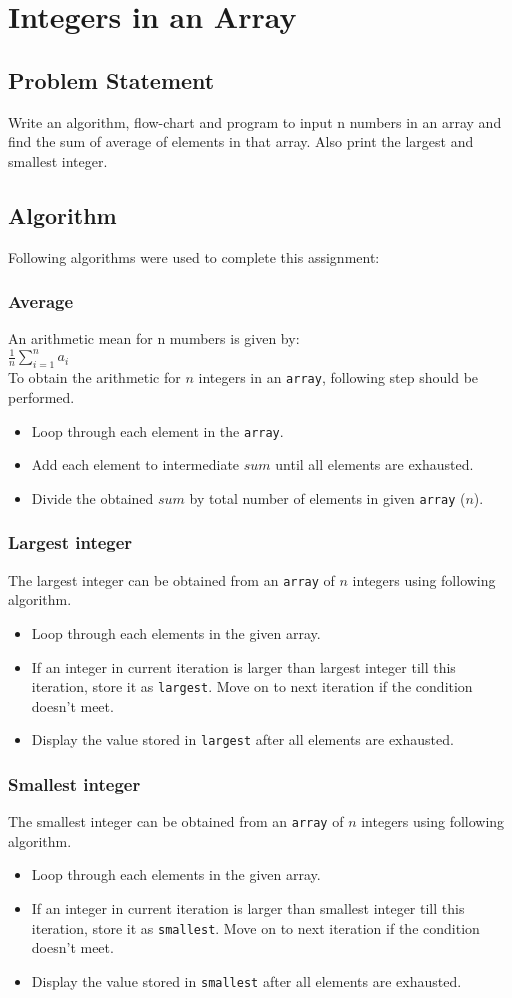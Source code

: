 \documentclass[11pt]{report}
\begin{document}
\chapter{Integers in an Array}
\section{Problem Statement}
Write an algorithm, flow-chart and program to input n numbers in an array and find the sum of average of elements in that array. Also print the largest and smallest integer.
\section{Algorithm}
Following algorithms were used to complete this assignment:
\subsection{Average}
An arithmetic mean for n mumbers is given by:\\
$
\frac{1}{n}\sum_{i=1}^{n}a_i
$ \\
To obtain the arithmetic for $n$ integers in an \texttt{array}, following step should be performed.
\begin{itemize}
  \item Loop through each element in the \texttt{array}.
  \item Add each element to intermediate $sum$ until all elements are exhausted.
  \item Divide the obtained $sum$ by total number of elements in given \texttt{array} ($n$).
\end{itemize}
\subsection{Largest integer}
The largest integer can be obtained from an \texttt{array} of $n$ integers using following algorithm.
\begin{itemize}
\item Loop through each elements in the given array.
\item If an integer in current iteration is larger than largest integer till this iteration, store it as \texttt{largest}. Move on to next iteration if the condition doesn't meet.
\item Display the value stored in \texttt{largest} after all elements are exhausted.
\end{itemize}
\subsection{Smallest integer}
The smallest integer can be obtained from an \texttt{array} of $n$ integers using following algorithm.
\begin{itemize}
\item Loop through each elements in the given array.
\item If an integer in current iteration is larger than smallest integer till this iteration, store it as \texttt{smallest}. Move on to next iteration if the condition doesn't meet.
\item Display the value stored in \texttt{smallest} after all elements are exhausted.
\end{itemize}
\end{document}

